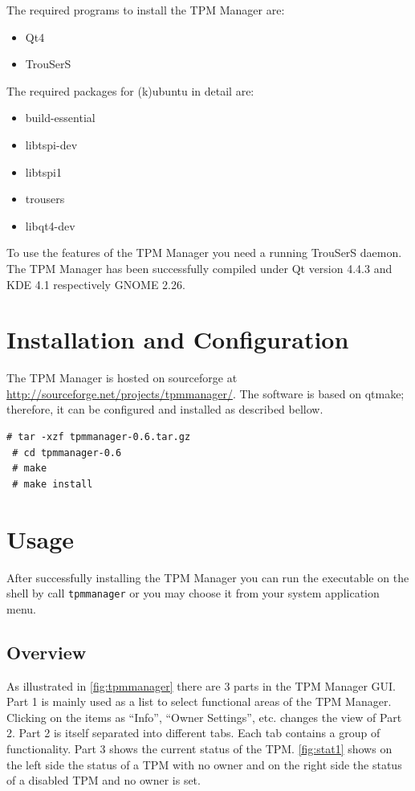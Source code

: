 \documentclass[
  american        %
]{sirrixreport}
\begin{document}
The required programs to install the TPM Manager are: 
\begin{itemize}
   \item Qt4
   \item TrouSerS
\end{itemize}

The required packages for (k)ubuntu in detail are:
\begin{itemize}
   \item build-essential
   \item libtspi-dev
   \item libtspi1
   \item trousers
   \item libqt4-dev
\end{itemize}

To use the features of the TPM Manager you need a running TrouSerS daemon.
The TPM Manager has been successfully compiled under Qt version 4.4.3 and KDE 4.1 respectively GNOME 2.26.


\section{Installation and Configuration}
The TPM Manager is hosted on sourceforge at \url{http://sourceforge.net/projects/tpmmanager/}. The software is based on qtmake; therefore, it can be configured and installed as described bellow.


 \begin{lstlisting}[caption=Configuring and compiling the TPM Manager:, frame=lines]
 # tar -xzf tpmmanager-0.6.tar.gz
 # cd tpmmanager-0.6
 # make
 # make install
 \end{lstlisting}  


\clearpage
\section{Usage}

After successfully installing the TPM Manager you can run the executable on the shell by call \texttt{tpmmanager} or you may choose it from your system application menu. 

\subsection{Overview}
As illustrated in \autoref{fig:tpmmanager} there are 3 parts in the TPM Manager GUI. 
Part 1 is mainly used as a list to select functional areas of the TPM Manager. Clicking on the items as ``Info'', ``Owner Settings'', etc. changes the view of Part 2. Part 2 is itself separated into different tabs. Each tab contains a group of functionality. Part 3 shows the current status of the TPM. \autoref{fig:stat1} shows on the left side the status of a TPM with no owner and on the right side the status of a disabled TPM and no owner is set.
\end{document}
